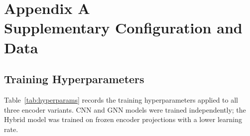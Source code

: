 \documentclass[12pt,a4paper]{report}
\begin{document}
\appendix


\chapter*{Appendix A \\[0.5cm] \Large Supplementary Configuration and Data}
\setcounter{chapter}{1} %
\renewcommand{\thesection}{A.\arabic{section}}
\renewcommand{\thetable}{A.\arabic{table}}
\label{chap:appendix}

\section{Training Hyperparameters}

Table~\ref{tab:hyperparams} records the training hyperparameters applied to all three encoder variants. CNN and GNN models were trained independently; the Hybrid model was trained on frozen encoder projections with a lower learning rate.
\end{document}
